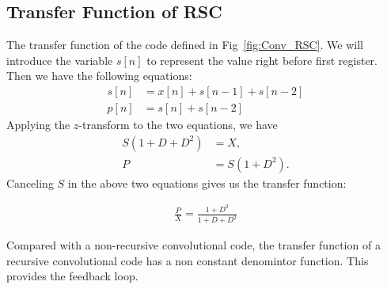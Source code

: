 \subsection{Transfer Function of RSC}
The transfer function of the code defined in Fig~\ref{fig:Conv_RSC}.
We will introduce the variable \(s[n]\) to represent the value right before first register. Then we have the following equations: 
\begin{align*}
s[n] &= x[n] + s[n-1] + s[n-2] \nonumber\\
p[n] &= s[n] + s[n-2]
\end{align*}
Applying the \(z\)-transform to the two equations, we have 
\begin{align*}
S(1+D + D^2) &= X, \\
P &= S(1 + D^2).
\end{align*}
Canceling \(S\) in the above two equations gives us the transfer function: 

\begin{align}
\frac{P}{X} = \frac{1+D^2}{1+ D + D^2} \label{eq:RSCTransfer}
\end{align}

Compared with a non-recursive convolutional code, the transfer function of a recursive convolutional code has a non constant denomintor function. This provides the feedback loop.



